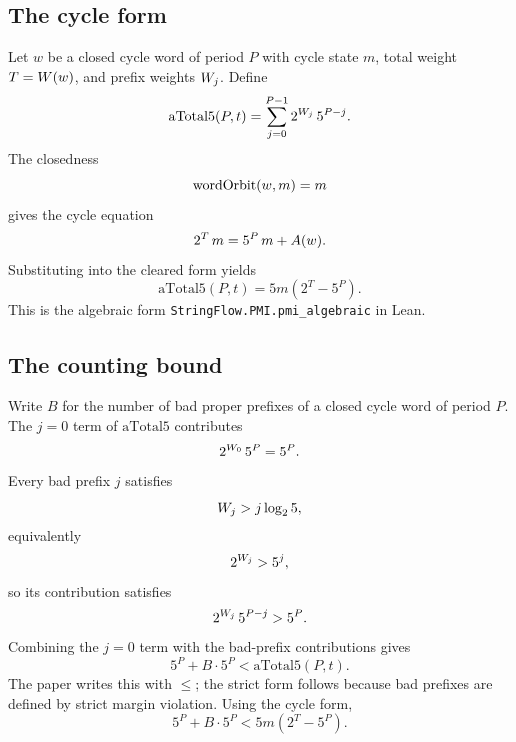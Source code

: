 \subsection{The cycle form}

Let $w$ be a closed cycle word of period $P$ with cycle state $m$,
total weight $T=W(w)$, and prefix weights
$W_j$.  Define
\begin{equation*}
  \mathrm{aTotal5}(P,t)
    =\sum_{j=0}^{P-1}2^{W_j}\,5^{P-j}.
\end{equation*}
The closedness
\begin{equation*}
  \mathrm{wordOrbit}(w,m)=m
\end{equation*}
gives the cycle equation
\begin{equation*}
  2^T\,m=5^P\,m+A(w).
\end{equation*}
Substituting into the cleared form yields
\begin{equation*}
  \mathrm{aTotal5}(P,t)
    =5m\left(2^T-5^P\right).
\end{equation*}
This is the algebraic form
\texttt{StringFlow.PMI.pmi\_\allowbreak algebraic} in Lean.

\subsection{The counting bound}

Write $B$ for the number of bad proper prefixes of a closed cycle
word of period $P$.  The $j=0$ term of $\mathrm{aTotal5}$ contributes
\begin{equation*}
  2^{W_0}\,5^{P}=5^P.
\end{equation*}
Every bad prefix $j$ satisfies
\begin{equation*}
  W_j>j\log_2 5,
\end{equation*}
equivalently
\begin{equation*}
  2^{W_j}>5^j,
\end{equation*}
so its contribution satisfies
\begin{equation*}
  2^{W_j}\,5^{P-j}>5^P.
\end{equation*}
Combining the $j=0$ term with the bad-prefix contributions gives
\begin{equation*}
  5^P+B\cdot5^P<\mathrm{aTotal5}(P,t).
\end{equation*}
The paper writes this with $\le$; the strict form follows because
bad prefixes are defined by strict margin violation.  Using the cycle
form,
\begin{equation*}
  5^P+B\cdot5^P<5m\left(2^T-5^P\right).
\end{equation*}

